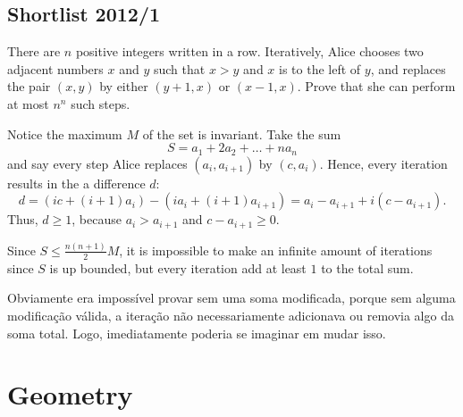 \documentclass[12pt]{article}
\begin{document}
\clearpage

\subsection{Shortlist 2012/1}

\begin{problem}
There are $n$ positive integers written in a row.
Iteratively, Alice chooses two adjacent numbers $x$ and $y$
such that $x>y$ and $x$ is to the left of $y$,
and replaces the pair $(x,y)$ by either $(y+1,x)$ or $(x-1,x)$.
Prove that she can perform at most $n^n$ such steps.
\end{problem}
Notice the maximum $M$ of the set is invariant. Take the sum
\[
	S=a_1+2a_2+\dots+na_n
\]
and say every step Alice replaces $(a_i,a_{i+1})$ by $(c,a_i)$. Hence,
every iteration results in the a difference $d$:
\[
	d=(ic+(i+1)a_i)-(ia_i+(i+1)a_{i+1})=a_i-a_{i+1}+i(c-a_{i+1}).
\]
Thus, $d \ge 1$, because $a_i > a_{i+1}$ and $c-a_{i+1} \ge 0$.

Since $S \le \frac{n(n+1)}{2}M$, it is impossible to make an infinite amount
of iterations since $S$ is up bounded, but every iteration add at least $1$ to the total sum.

\begin{insight}
	Obviamente era impossível provar sem uma soma modificada, porque sem alguma modificação válida,
	a iteração não necessariamente adicionava ou removia algo da soma total. Logo, imediatamente
	poderia se imaginar em mudar isso.
\end{insight}

\clearpage

\section{Geometry}
\end{document}
